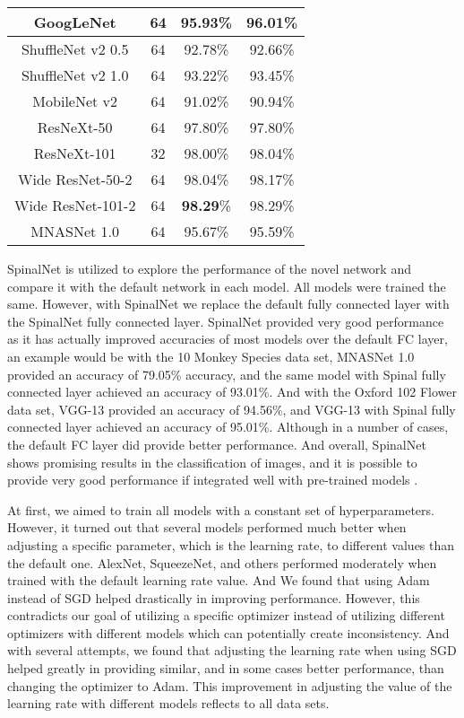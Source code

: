 \documentclass[conference]{IEEEtran}
\begin{document}
\begin{table}
\begin{tabular}{|c|c|c|c|}
    \hline GoogLeNet    & 64 &  95.93\%    & 96.01\%   \\
    \hline ShuffleNet v2 0.5 & 64 &  92.78\%    & 92.66\%   \\
    \hline ShuffleNet v2 1.0 & 64 &  93.22\%    & 93.45\%   \\
    \hline MobileNet v2  & 64 &  91.02\%    & 90.94\%   \\
    \hline ResNeXt-50   & 64 &  97.80\%    & 97.80\%   \\
    \hline ResNeXt-101  & 32 &  98.00\%    & 98.04\%   \\
    \hline Wide ResNet-50-2 & 64 &  98.04\%    & 98.17\%   \\
    \hline Wide ResNet-101-2 & 64 &  \textbf{98.29}\%    & 98.29\%   \\
    \hline MNASNet 1.0 & 64 &  95.67\%    & 95.59\%   \\
    \hline
\end{tabular} 
\end{table}



SpinalNet is utilized to explore the performance of the novel network and compare it with the default network in each model. All models were trained the same. However, with SpinalNet we replace the default fully connected layer with the SpinalNet fully connected layer. SpinalNet provided very good performance as it has actually improved accuracies of most models over the default FC layer, an example would be with the 10 Monkey Species data set, MNASNet 1.0 provided an accuracy of 79.05\% accuracy, and the same model with Spinal fully connected layer achieved an accuracy of 93.01\%. And with the Oxford 102 Flower data set, VGG-13 provided an accuracy of 94.56\%, and VGG-13 with Spinal fully connected layer achieved an accuracy of 95.01\%. Although in a number of cases, the default FC layer did provide better performance. And overall, SpinalNet shows promising results in the classification of images, and it is possible to provide very good performance if integrated well with pre-trained models .

At first, we aimed to train all models with a constant set of hyperparameters. However, it turned out that several models performed much better when adjusting a specific parameter, which is the learning rate, to different values than the default one. AlexNet, SqueezeNet, and others performed moderately when trained with the default learning rate value. And We found that using Adam instead of SGD helped drastically in improving performance. However, this contradicts our goal of utilizing a specific optimizer instead of utilizing different optimizers with different models which can potentially create inconsistency. And with several attempts, we found that adjusting the learning rate when using SGD helped greatly in providing similar, and in some cases better performance, than changing the optimizer to Adam. This improvement in adjusting the value of the learning rate with different models reflects to all data sets. 
\end{document}
